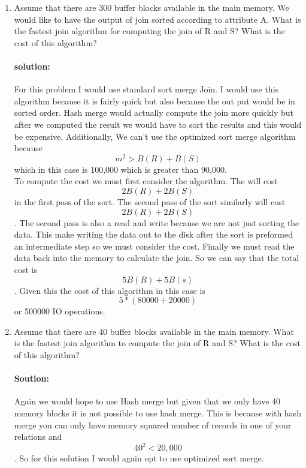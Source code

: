 \documentclass[11pt]{article}
\begin{document}
\begin{enumerate}
\item Assume that there are 300 buffer blocks available in the main memory. 
We would like to have the output of join sorted according to attribute A. 
What is the fastest join algorithm for computing the join of R and S? What is the cost of this algorithm? 

\paragraph{solution:} \hfill \break
For this problem I would use standard sort merge Join. I would use this algorithm because it is fairly quick but also because the out put would be in sorted order. Hash merge would actually compute the join more quickly but after we computed the result we would have to sort the results and this would be expensive. Additionally, We can't use the optimized sort merge algorithm because \[ m^2 > B(R) + B(S)\] which in this case is 100,000 which is greater than 90,000.\\

To compute the cost we must first consider the algorithm. The will cost \[ 2 B(R) + 2 B(S)\] in the first pass of the sort. The second pass of the sort similarly will cost \[2 B(R) + 2 B(S) \]. The second pass is also a read and write because we are not just sorting the data. This make writing the data out to the disk after the sort is preformed an intermediate step so we must consider the cost. Finally we must read the data back into the memory to calculate the join. So we can say that the total cost is \[ 5 B(R) + 5 B(s)\]. Given this the cost of this algorithm in this case is \[ 5* (80000 + 20000) \] or 500000 IO operations.\\ 


\item Assume that there are 40 buffer blocks available in the main memory. 
What is the fastest join algorithm to compute the join of R and S? What is the cost of this algorithm? \\

\paragraph{Soution:} \hfill \break
Again we would hope to use Hash merge but given that we only have 40 memory blocks it is not possible to use hash merge. This is because with hash merge you can only have memory squared number of records in one of your relations and \[40^2 < 20,000\]. So for this solution I would again opt to use optimized sort merge.\\


\end{enumerate}
\end{document}
